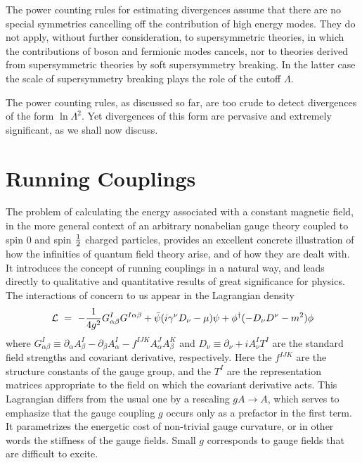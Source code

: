 \documentclass[12pt]{article}
\begin{document}
The power counting
rules for estimating divergences assume that there are no special
symmetries cancelling off the contribution of high energy modes.  They
do not apply, without further consideration, to supersymmetric
theories, in which the contributions of boson and fermionic modes
cancels, nor to theories derived from supersymmetric theories by soft
supersymmetry breaking.  In the latter case the scale of supersymmetry
breaking plays the role of the cutoff $\Lambda$. 

The power counting
rules, as discussed so far, are too crude to detect divergences of the
form $\ln \Lambda^2$.  Yet divergences of this form are pervasive and
extremely significant, as we shall now discuss.




\section{Running Couplings }


The problem of calculating the energy associated with a constant
magnetic field, in the more general context of an arbitrary nonabelian
gauge theory coupled to spin 0 and spin ${1\over 2}$ charged
particles, provides an excellent concrete illustration of how the
infinities of quantum field theory arise, and of how they are dealt
with.  It introduces the concept of running couplings in a natural
way, and leads directly to qualitative and quantitative results of
great significance for physics. The interactions of concern to us
appear in the Lagrangian density
\begin{equation}{\cal L} ~=~ -{1\over 4g^2} G^I_{\alpha \beta}
G^{I\alpha\beta} + \bar \psi (i\gamma^\nu D_\nu - \mu ) \psi
+\phi^\dagger(-D_\nu D^\nu - m^2 ) \phi
\label{eq:lagr}
\end{equation}
where $G^I_{\alpha \beta} \equiv
\partial_\alpha A^I_\beta - \partial_\beta A^I_\alpha -f^{IJK}
A^J_\alpha A^K_\beta $ and $D_\nu \equiv \partial_\nu + i A^I_\nu T^I$
are the standard field strengths and covariant derivative,
respectively.  Here the $f^{IJK}$ are the structure constants of the
gauge group, and the $T^I$ are the representation matrices appropriate
to the field on which the covariant derivative acts.  This Lagrangian
differs from the usual one by a rescaling $gA \rightarrow A$, which
serves to emphasize that the gauge coupling $g$ occurs only as a
prefactor in the first term. It parametrizes the energetic cost of
non-trivial gauge curvature, or in other words the stiffness of the
gauge fields.  Small $g$ corresponds to gauge fields that are
difficult to excite.  
\end{document}
